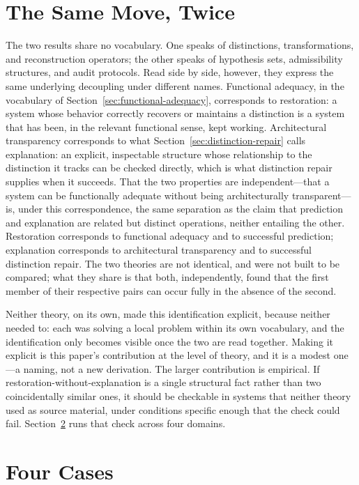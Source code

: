 \documentclass[11pt]{article}
\theoremstyle{plain}
\begin{document}
\section{The Same Move, Twice}
\label{sec:same-move}

The two results share no vocabulary. One speaks of distinctions, transformations, and reconstruction operators; the other speaks of hypothesis sets, admissibility structures, and audit protocols. Read side by side, however, they express the same underlying decoupling under different names. Functional adequacy, in the vocabulary of Section~\ref{sec:functional-adequacy}, corresponds to restoration: a system whose behavior correctly recovers or maintains a distinction is a system that has been, in the relevant functional sense, kept working. Architectural transparency corresponds to what Section~\ref{sec:distinction-repair} calls explanation: an explicit, inspectable structure whose relationship to the distinction it tracks can be checked directly, which is what distinction repair supplies when it succeeds. That the two properties are independent---that a system can be functionally adequate without being architecturally transparent---is, under this correspondence, the same separation as the claim that prediction and explanation are related but distinct operations, neither entailing the other. Restoration corresponds to functional adequacy and to successful prediction; explanation corresponds to architectural transparency and to successful distinction repair. The two theories are not identical, and were not built to be compared; what they share is that both, independently, found that the first member of their respective pairs can occur fully in the absence of the second.

Neither theory, on its own, made this identification explicit, because neither needed to: each was solving a local problem within its own vocabulary, and the identification only becomes visible once the two are read together. Making it explicit is this paper's contribution at the level of theory, and it is a modest one---a naming, not a new derivation. The larger contribution is empirical. If restoration-without-explanation is a single structural fact rather than two coincidentally similar ones, it should be checkable in systems that neither theory used as source material, under conditions specific enough that the check could fail. Section~\ref{sec:cases} runs that check across four domains.

\section{Four Cases}
\label{sec:cases}
\end{document}
